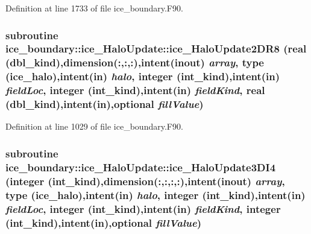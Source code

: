 Definition at line 1733 of file ice\_\-boundary.F90.\hypertarget{interfaceice__boundary_1_1ice__HaloUpdate_a82dea76fd78278fc545d3faf6bced380}{
\subsubsection[{ice\_\-HaloUpdate2DR8}]{\setlength{\rightskip}{0pt plus 5cm}subroutine ice\_\-boundary::ice\_\-HaloUpdate::ice\_\-HaloUpdate2DR8 (real (dbl\_\-kind),dimension(:,:,:),intent(inout) {\em array}, \/  type ({\bf ice\_\-halo}),intent(in) {\em halo}, \/  integer (int\_\-kind),intent(in) {\em fieldLoc}, \/  integer (int\_\-kind),intent(in) {\em fieldKind}, \/  real (dbl\_\-kind),intent(in),optional {\em fillValue})}}
\label{interfaceice__boundary_1_1ice__HaloUpdate_a82dea76fd78278fc545d3faf6bced380}


Definition at line 1029 of file ice\_\-boundary.F90.\hypertarget{interfaceice__boundary_1_1ice__HaloUpdate_aa7d77351c8f404017ba32791c035fc5a}{
\subsubsection[{ice\_\-HaloUpdate3DI4}]{\setlength{\rightskip}{0pt plus 5cm}subroutine ice\_\-boundary::ice\_\-HaloUpdate::ice\_\-HaloUpdate3DI4 (integer (int\_\-kind),dimension(:,:,:,:),intent(inout) {\em array}, \/  type ({\bf ice\_\-halo}),intent(in) {\em halo}, \/  integer (int\_\-kind),intent(in) {\em fieldLoc}, \/  integer (int\_\-kind),intent(in) {\em fieldKind}, \/  integer (int\_\-kind),intent(in),optional {\em fillValue})}}
\label{interfaceice__boundary_1_1ice__HaloUpdate_aa7d77351c8f404017ba32791c035fc5a}


